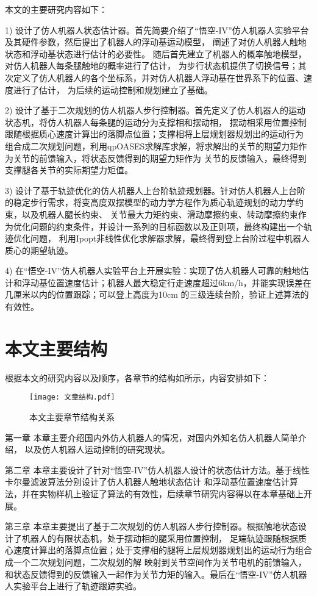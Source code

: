 本文的主要研究内容如下：

1) 设计了仿人机器人状态估计器。首先简要介绍了“悟空-IV”仿人机器人实验平台及其硬件参数，然后提出了机器人的浮动基运动模型，
阐述了对仿人机器人触地状态和浮动基状态进行估计的必要性。
随后首先建立了机器人的概率触地模型，对仿人机器人每条腿触地的概率进行了估计，
为步行状态机提供了切换信号；其次定义了仿人机器人的各个坐标系，并对仿人机器人浮动基在世界系下的位置、速度进行了估计，
为后续的运动控制和规划建立了基础。

2) 设计了基于二次规划的仿人机器人步行控制器。首先定义了仿人机器人的运动状态机，将仿人机器人每条腿的运动分为支撑相和摆动相，
摆动相采用位置控制跟随根据质心速度计算出的落脚点位置；支撑相将上层规划器规划出的运动行为
组合成二次规划问题，利用qpOASES求解库求解，将求解出的关节的期望力矩作为关节的前馈输入，将状态反馈得到的期望力矩作为
关节的反馈输入，最终得到支撑腿各关节的实际期望力矩值。

3) 设计了基于轨迹优化的仿人机器人上台阶轨迹规划器。针对仿人机器人上台阶的稳定步行需求，将变高度双摆模型的动力学方程作为质心轨迹规划的动力学约束，以及机器人腿长约束、
关节最大力矩约束、滑动摩擦约束、转动摩擦约束作为优化问题的约束条件，并设计一系列的目标函数以及正则项，最终构建出一个轨迹优化问题，
利用Ipopt非线性优化求解器求解，最终得到登上台阶过程中机器人质心的期望轨迹。

4) 在“悟空-IV”仿人机器人实验平台上开展实验：实现了仿人机器人可靠的触地估计和浮动基位置速度估计；机器人最大稳定行走速度超过6km/h，并能实现误差在几厘米以内的位置跟踪；可以登上高度为10cm
的三级连续台阶，验证上述算法的有效性。

\section{本文主要结构}
根据本文的研究内容以及顺序，各章节的结构如所示，内容安排如下：
\begin{figure}[h]
    \centering
    \texttt{[image: 文章结构.pdf]}
    \caption{\label{fig:artticle_struct}本文主要章节结构关系}
\end{figure}
第一章 本章主要介绍国内外仿人机器人的情况，对国内外知名仿人机器人简单介绍，
以及仿人机器人运动控制的研究现状。

第二章 本章主要设计了针对“悟空-IV”仿人机器人设计的状态估计方法。基于线性卡尔曼滤波算法分别设计了仿人机器人触地状态估计
和浮动基位置速度估计算法，并在实物样机上验证了算法的有效性，后续章节研究内容得以在本章基础上开展。

第三章 本章主要提出了基于二次规划的仿人机器人步行控制器。根据触地状态设计了机器人的有限状态机，处于摆动相的腿采用位置控制，
足端轨迹跟随根据质心速度计算出的落脚点位置；处于支撑相的腿将上层规划器规划出的运动行为组合成一个二次规划问题，二次规划的解
映射到关节空间作为关节电机的前馈输入，和状态反馈得到的反馈输入一起作为关节力矩的输入。最后在“悟空-IV”仿人机器人实验平台上进行了轨迹跟踪实验。

